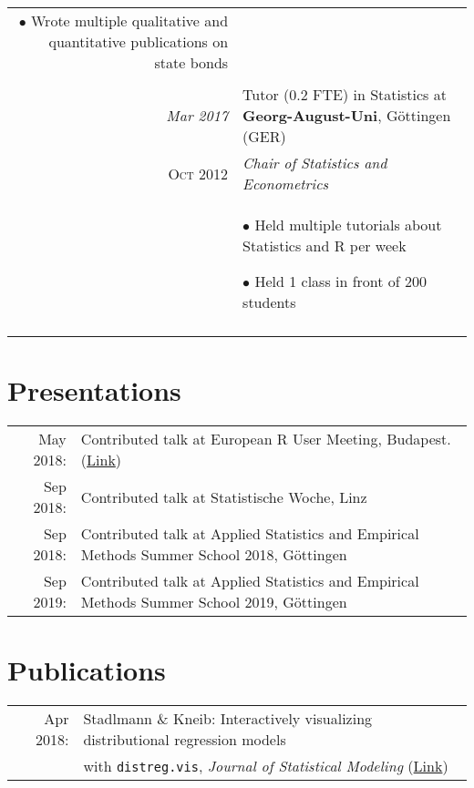 \documentclass[a4paper,10pt]{article} %
\begin{document}
\begin{longtable}{r|p{10cm}}
{$\bullet$ Wrote multiple qualitative and quantitative publications on state bonds}\\
\multicolumn{2}{c}{} \\


\emph{Mar 2017} & Tutor (0.2 FTE) in Statistics at \textbf{Georg-August-Uni}, Göttingen (GER)\\
\textsc{Oct 2012} & \emph{Chair of Statistics and Econometrics}\\
& \footnotesize{$\bullet$ Held multiple tutorials about Statistics and R per week

$\bullet$ Held 1 class in front of 200 students}\\
\multicolumn{2}{c}{} \\


\end{longtable}


\section{Presentations}
\begin{tabular}{rl}
May 2018: & Contributed talk at European R User Meeting, Budapest. (\href{https://www.youtube.com/watch?v=ZeBvYWCxkOE}{Link})\\
Sep 2018: & Contributed talk at Statistische Woche, Linz \\
Sep 2018: & Contributed talk at Applied Statistics and Empirical Methods Summer School 2018, Göttingen \\
Sep 2019: & Contributed talk at Applied Statistics and Empirical Methods Summer School 2019, Göttingen \\

\end{tabular}

\section{Publications}
\begin{tabular}{rl}
	Apr 2018: & Stadlmann \& Kneib: Interactively visualizing distributional regression models \\ & with \texttt{distreg.vis},  \emph{Journal of Statistical Modeling} (\href{https://journals.sagepub.com/doi/full/10.1177/1471082X211007308}{Link})\\
	
\end{tabular}
\end{document}
